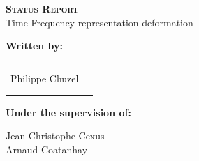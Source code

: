 
\begingroup
\thispagestyle{empty}
\begin{center}
\vspace*{2cm}
{\Huge \textsc{\textbf{Status Report}}}\\


\vspace*{2cm}
{\huge Time Frequency representation deformation}\par %
\end{center}

\vspace*{1.5cm}
\textbf{\large Written by:} 
\begin{center}
{\large
\begin{tabular}{cc}
\\
\\
\\
Philippe Chuzel\\
\\
\\
\end{tabular}}
\end{center}


\vspace*{1.5 cm}
{\large \textbf{Under the supervision of:}}\\
\begin{center}
{\large
Jean-Christophe Cexus\\
Arnaud Coatanhay\\}
\end{center}
\endgroup
